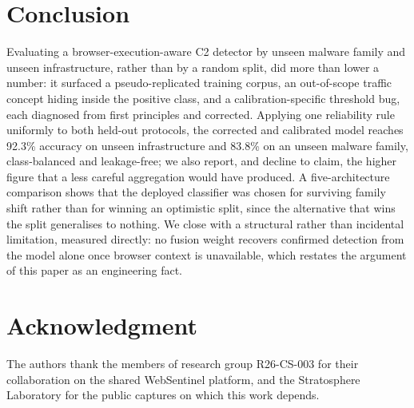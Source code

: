\documentclass[conference,a4paper]{IEEEtran}
\begin{document}
\section{Conclusion}

Evaluating a browser-execution-aware C2 detector by unseen malware family and unseen infrastructure, rather than by a random split, did more than lower a number: it surfaced a pseudo-replicated training corpus, an out-of-scope traffic concept hiding inside the positive class, and a calibration-specific threshold bug, each diagnosed from first principles and corrected. Applying one reliability rule uniformly to both held-out protocols, the corrected and calibrated model reaches 92.3\% accuracy on unseen infrastructure and 83.8\% on an unseen malware family, class-balanced and leakage-free; we also report, and decline to claim, the higher figure that a less careful aggregation would have produced. A five-architecture comparison shows that the deployed classifier was chosen for surviving family shift rather than for winning an optimistic split, since the alternative that wins the split generalises to nothing. We close with a structural rather than incidental limitation, measured directly: no fusion weight recovers confirmed detection from the model alone once browser context is unavailable, which restates the argument of this paper as an engineering fact.

\section*{Acknowledgment}
The authors thank the members of research group R26-CS-003 for their collaboration on the shared WebSentinel platform, and the Stratosphere Laboratory for the public captures on which this work depends.



\end{document}
